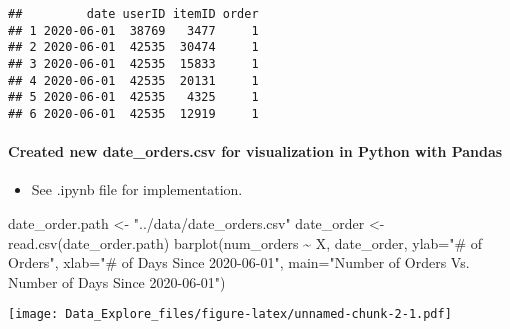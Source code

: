 \documentclass[
]{article}
\newenvironment{Shaded}{\begin{snugshade}}{\end{snugshade}}
\newcommand{\AttributeTok}[1]{\textcolor[rgb]{0.77,0.63,0.00}{#1}}
\newcommand{\FunctionTok}[1]{\textcolor[rgb]{0.00,0.00,0.00}{#1}}
\newcommand{\NormalTok}[1]{#1}
\newcommand{\OtherTok}[1]{\textcolor[rgb]{0.56,0.35,0.01}{#1}}
\newcommand{\SpecialCharTok}[1]{\textcolor[rgb]{0.00,0.00,0.00}{#1}}
\newcommand{\StringTok}[1]{\textcolor[rgb]{0.31,0.60,0.02}{#1}}
\providecommand{\tightlist}{%
  \setlength{\itemsep}{0pt}\setlength{\parskip}{0pt}}
\begin{document}
\begin{verbatim}
##         date userID itemID order
## 1 2020-06-01  38769   3477     1
## 2 2020-06-01  42535  30474     1
## 3 2020-06-01  42535  15833     1
## 4 2020-06-01  42535  20131     1
## 5 2020-06-01  42535   4325     1
## 6 2020-06-01  42535  12919     1
\end{verbatim}

\hypertarget{created-new-date_orders.csv-for-visualization-in-python-with-pandas}{%
\paragraph{Created new date\_orders.csv for visualization in Python with
Pandas}\label{created-new-date_orders.csv-for-visualization-in-python-with-pandas}}

\begin{itemize}
\tightlist
\item
  See .ipynb file for implementation.
\end{itemize}

\begin{Shaded}
\begin{Highlighting}[]
\NormalTok{date\_order.path }\OtherTok{\textless{}{-}} \StringTok{"../data/date\_orders.csv"}
\NormalTok{date\_order }\OtherTok{\textless{}{-}} \FunctionTok{read.csv}\NormalTok{(date\_order.path)}
\FunctionTok{barplot}\NormalTok{(num\_orders }\SpecialCharTok{\textasciitilde{}}\NormalTok{ X, date\_order,}
        \AttributeTok{ylab=}\StringTok{"\# of Orders"}\NormalTok{,}
        \AttributeTok{xlab=}\StringTok{"\# of Days Since 2020{-}06{-}01"}\NormalTok{,}
        \AttributeTok{main=}\StringTok{"Number of Orders Vs. Number of Days Since 2020{-}06{-}01"}\NormalTok{)}
\end{Highlighting}
\end{Shaded}

\texttt{[image: Data\_Explore\_files/figure-latex/unnamed-chunk-2-1.pdf]}
\end{document}
